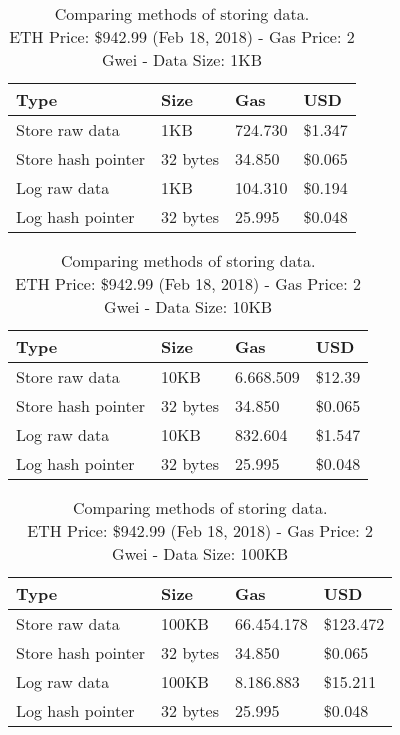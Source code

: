 \begin{table}[!ht]
  \centering
  \begin{tabular}{|l|l|l|l|}
  \hline
    Type & Size & Gas  & USD \\ \hline
    Store raw data & 1KB & 724.730  & \$1.347 \\ \hline
    Store hash pointer & 32 bytes & 34.850  & \$0.065 \\ \hline
    Log raw data & 1KB & 104.310  & \$0.194 \\ \hline
    Log hash pointer & 32 bytes & 25.995  & \$0.048 \\ \hline
  \end{tabular}
  \captionsetup{format=hang, justification=centering}
  \caption{Comparing methods of storing data.\\ ETH Price: \$942.99 (Feb 18, 2018) - Gas Price: 2 Gwei - Data Size: 1KB}
  \label{table:data_store_comparison_02}
\end{table}

\begin{table}[!ht]
  \centering
  \begin{tabular}{|l|l|l|l|}
    \hline
      Type & Size & Gas  & USD \\ \hline
      Store raw data & 10KB & 6.668.509  & \$12.39 \\ \hline
      Store hash pointer & 32 bytes & 34.850  & \$0.065 \\ \hline
      Log raw data & 10KB & 832.604  & \$1.547 \\ \hline
      Log hash pointer & 32 bytes & 25.995  & \$0.048 \\ \hline
  \end{tabular}
  \captionsetup{format=hang, justification=centering}
  \caption{Comparing methods of storing data.\\ ETH Price: \$942.99 (Feb 18, 2018) - Gas Price: 2 Gwei - Data Size: 10KB}
  \label{table:data_store_comparison_03}
\end{table}

\begin{table}[!ht]
  \centering
  \begin{tabular}{|l|l|l|l|}
    \hline
    Type & Size & Gas  & USD \\ \hline
    Store raw data & 100KB & 66.454.178  & \$123.472 \\ \hline
    Store hash pointer & 32 bytes & 34.850  & \$0.065 \\ \hline
    Log raw data & 100KB & 8.186.883  & \$15.211 \\ \hline
    Log hash pointer & 32 bytes & 25.995  & \$0.048 \\ \hline
  \end{tabular}
  \captionsetup{format=hang, justification=centering}
  \caption{Comparing methods of storing data.\\ ETH Price: \$942.99 (Feb 18, 2018) - Gas Price: 2 Gwei - Data Size: 100KB}
  \label{table:data_store_comparison_04}
\end{table}


